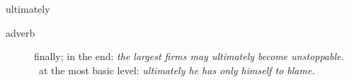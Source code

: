 \documentclass[avery5372, grid]{flashcards}
\begin{document}
\begin{flashcard}{\Huge ultimately}
\begin{description}
			
			
			
			
		\item[adverb] 
			finally; in the end: \textit{the largest firms may ultimately become unstoppable.}\\
			\textbullet\ at the most basic level: \textit{ultimately he has only himself to blame.}\\
			
			
			
			
	\end{description}
\end{flashcard}






\end{document}
